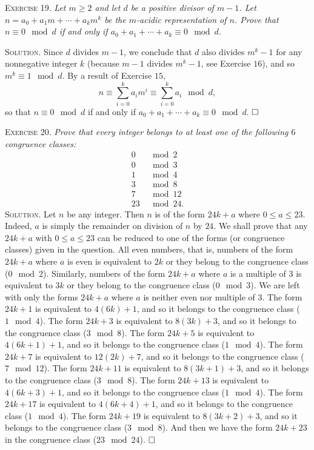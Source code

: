 \documentclass[11pt, leqno]{article}
\newcommand{\done}{\ensuremath{\hfill\square}}
\begin{document}
\textsc{Exercise 19}. \emph{Let $m \geq 2$ and let $d$ be a positive divisor of $m-1$. Let $n = a_0 + a_1m + \cdots + a_km^k$ be the $m$-acidic representation of $n$. Prove that $n \equiv 0 \mod d$ if and only if $a_0 + a_1 + \cdots + a_k \equiv 0 \mod d$.}

\textsc{Solution}. Since $d$ divides $m-1$, we conclude that $d$ also divides $m^k-1$ for any nonnegative integer $k$ (because $m-1$ divides $m^k-1$, see Exercise $16$), and so $m^k \equiv 1 \mod d$. By a result of Exercise $15$, 
\begin{displaymath}
n \equiv \sum_{i=0}^k a_im^i \equiv \sum_{i=0}^k a_i \mod d,
\end{displaymath}
so that $n \equiv 0 \mod d$ if and only if $a_0 + a_1 + \cdots + a_k \equiv 0 \mod d$. \done

\textsc{Exercise 20}. \emph{Prove that every integer belongs to at least one of the following $6$ congruence classes: 
\begin{align*}
  0 &\mod 2 \\
  0 &\mod 3 \\
  1 &\mod 4 \\
  3 &\mod 8 \\
  7 &\mod 12 \\
  23 &\mod 24.
\end{align*}}\textsc{Solution}. Let $n$ be any integer. Then $n$ is of the form $24k + a$ where $0 \leq a \leq 23$. Indeed, $a$ is simply the remainder on division of $n$ by $24$. We shall prove that any $24k + a$ with $0 \leq a \leq 23$ can be reduced to one of the forms (or congruence classes) given in the question. All even numbers, that is, numbers of the form $24k + a$ where $a$ is even is equivalent to $2k$ or they belong to the congruence class ($0 \mod 2$). Similarly, numbers of the form $24k + a$ where $a$ is a multiple of $3$ is equivalent to $3k$ or they belong to the congruence class ($0 \mod 3$). We are left with only the forms $24k + a$ where $a$ is neither even nor multiple of $3$. The form $24k + 1$ is equivalent to $4(6k)+1$, and so it belongs to the congruence class ($1 \mod 4$). The form $24k+ 3$ is equivalent to $8(3k) + 3$, and so it belongs to the congruence class ($3 \mod 8$). The form $24k + 5$ is equivalent to $4(6k+1) + 1$, and so it belongs to the congruence class ($1 \mod 4$). The form $24k + 7$ is equivalent to $12(2k) + 7$, and so it belongs to the congruence class ($7 \mod 12$). The form $24k + 11$ is equivalent to $8(3k + 1) + 3$, and so it belongs to the congruence class ($3 \mod 8$). The form $24k + 13$ is equivalent to $4(6k + 3) + 1$, and so it belongs to the congruence class ($1 \mod 4$). The form $24k + 17$ is equivalent to $4(6k + 4) + 1$, and so it belongs to the congruence class ($1 \mod 4$). The form $24k + 19$ is equivalent to $8(3k + 2) + 3$, and so it belongs to the congruence class ($3 \mod 8$). And then we have the form $24k + 23$ in the congruence class ($23 \mod 24$). \done
\end{document}
